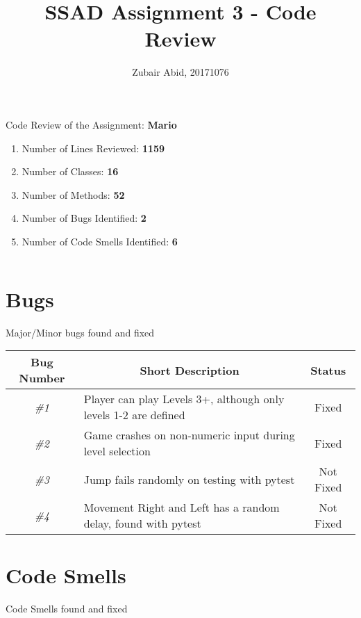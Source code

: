\documentclass[11pt,a4paper]{article}
\title{SSAD Assignment 3 - Code Review}
\author{Zubair Abid, 20171076}
\date{}
\begin{document}
	\maketitle
	Code Review of the Assignment: \textbf{Mario}\\
    \begin{enumerate}
    	\item Number of Lines Reviewed: \textbf{1159}
    	
    	\item Number of Classes: \textbf{16}
    	
    	\item Number of Methods: \textbf{52}
    	
    	\item Number of Bugs Identified: \textbf{2}
    	
    	\item Number of Code Smells Identified: \textbf{6}
    \end{enumerate}
	$ $\\
	
	\section{Bugs}	
	Major/Minor bugs found and fixed	

	\begin{table}[H]
		\centering
		\begin{tabular}{@{}clc@{}}
			\toprule
			\textbf{Bug Number} & \multicolumn{1}{c}{\textbf{Short Description}} & \textbf{Status} \\ \midrule
			\textit{\#1} & Player can play Levels 3+,  although only levels 1-2 are defined & Fixed \\
			\textit{\#2} & Game crashes on non-numeric input during level selection & Fixed \\ 
			\textit{\#3} & Jump fails randomly on testing with pytest & Not Fixed \\
			\textit{\#4} & Movement Right and Left has a random delay, found with pytest & Not Fixed \\ \bottomrule
		\end{tabular}
	\end{table}

	\section{Code Smells}
	Code Smells found and fixed	
		
\end{document}
